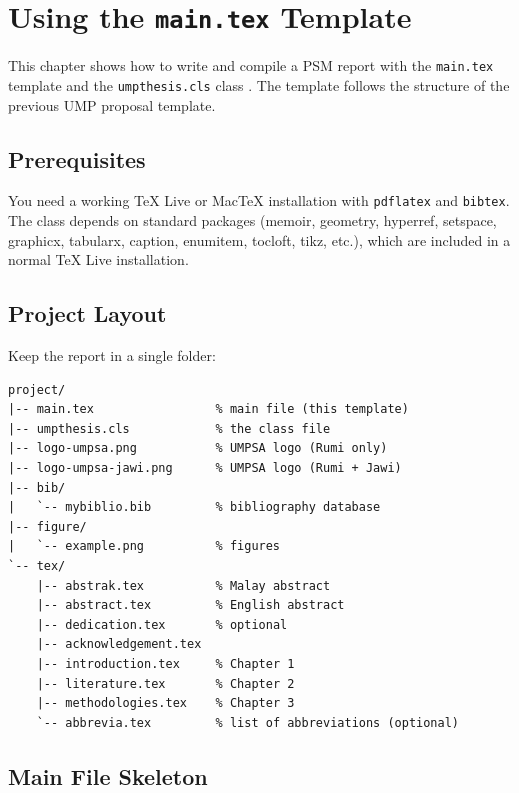 \chapter{Using the \texttt{main.tex} Template}
\label{chap:latex}

This chapter shows how to write and compile a PSM report with the \texttt{main.tex} template and the \texttt{umpthesis.cls} class \citep{umpthesiscls}. The template follows the structure of the previous UMP proposal template.

\section{Prerequisites}

You need a working TeX Live or MacTeX installation with \texttt{pdflatex} and \texttt{bibtex}. The class depends on standard packages (memoir, geometry, hyperref, setspace, graphicx, tabularx, caption, enumitem, tocloft, tikz, etc.), which are included in a normal TeX Live installation.

\section{Project Layout}

Keep the report in a single folder:

\begin{verbatim}
project/
|-- main.tex                 % main file (this template)
|-- umpthesis.cls            % the class file
|-- logo-umpsa.png           % UMPSA logo (Rumi only)
|-- logo-umpsa-jawi.png      % UMPSA logo (Rumi + Jawi)
|-- bib/
|   `-- mybiblio.bib         % bibliography database
|-- figure/
|   `-- example.png          % figures
`-- tex/
    |-- abstrak.tex          % Malay abstract
    |-- abstract.tex         % English abstract
    |-- dedication.tex       % optional
    |-- acknowledgement.tex
    |-- introduction.tex     % Chapter 1
    |-- literature.tex       % Chapter 2
    |-- methodologies.tex    % Chapter 3
    `-- abbrevia.tex         % list of abbreviations (optional)
\end{verbatim}

\section{Main File Skeleton}

